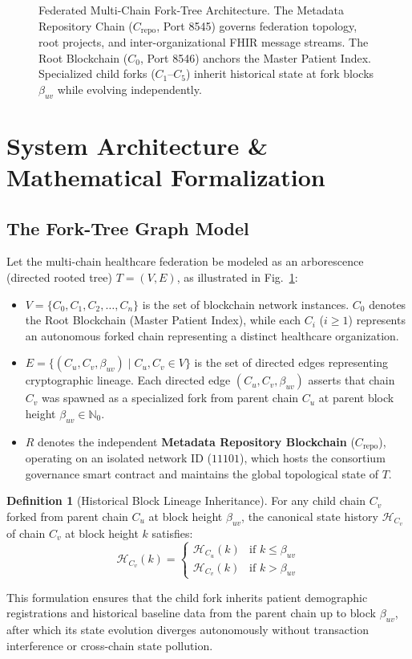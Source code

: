 \documentclass[conference]{IEEEtran}
\theoremstyle{definition}
\newtheorem{definition}{Definition}
\begin{document}
\begin{figure}[t]
\centering

\caption{Federated Multi-Chain Fork-Tree Architecture. The Metadata Repository Chain ($C_{\text{repo}}$, Port 8545) governs federation topology, root projects, and inter-organizational FHIR message streams. The Root Blockchain ($C_0$, Port 8546) anchors the Master Patient Index. Specialized child forks ($C_1$--$C_5$) inherit historical state at fork blocks $\beta_{uv}$ while evolving independently.}
\label{fig:topology}
\end{figure}

\section{System Architecture \& Mathematical Formalization}

\subsection{The Fork-Tree Graph Model}
Let the multi-chain healthcare federation be modeled as an arborescence (directed rooted tree) $T = (V, E)$, as illustrated in Fig.~\ref{fig:topology}:
\begin{itemize}
    \item $V = \{C_0, C_1, C_2, \dots, C_n\}$ is the set of blockchain network instances. $C_0$ denotes the Root Blockchain (Master Patient Index), while each $C_i$ ($i \ge 1$) represents an autonomous forked chain representing a distinct healthcare organization.
    \item $E = \{(C_u, C_v, \beta_{uv}) \mid C_u, C_v \in V\}$ is the set of directed edges representing cryptographic lineage. Each directed edge $(C_u, C_v, \beta_{uv})$ asserts that chain $C_v$ was spawned as a specialized fork from parent chain $C_u$ at parent block height $\beta_{uv} \in \mathbb{N}_0$.
    \item $R$ denotes the independent \textbf{Metadata Repository Blockchain} ($C_{\text{repo}}$), operating on an isolated network ID ($11101$), which hosts the consortium governance smart contract and maintains the global topological state of $T$.
\end{itemize}

\begin{definition}[Historical Block Lineage Inheritance]
For any child chain $C_v$ forked from parent chain $C_u$ at block height $\beta_{uv}$, the canonical state history $\mathcal{H}_{C_v}$ of chain $C_v$ at block height $k$ satisfies:
\begin{equation}
\mathcal{H}_{C_v}(k) = \begin{cases} 
\mathcal{H}_{C_u}(k) & \text{if } k \le \beta_{uv} \\
\mathcal{H}_{C_v}(k) & \text{if } k > \beta_{uv}
\end{cases}
\end{equation}
\end{definition}
This formulation ensures that the child fork inherits patient demographic registrations and historical baseline data from the parent chain up to block $\beta_{uv}$, after which its state evolution diverges autonomously without transaction interference or cross-chain state pollution.
\end{document}
